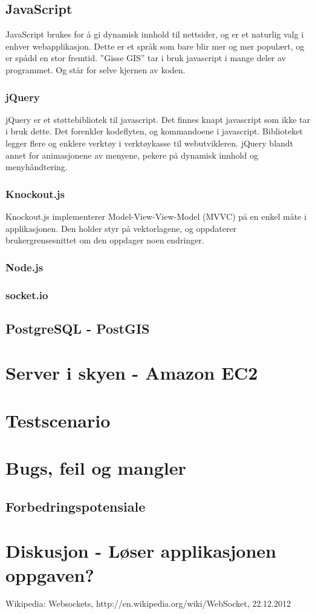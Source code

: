 \documentclass[12pt,twoside,onecolumn]{article}
\begin{document}
	\subsection{JavaScript}
	
		JavaScript brukes for å gi dynamisk innhold til nettsider, og er et naturlig valg i enhver webapplikasjon. Dette er et språk som bare blir mer og mer populært, og er spådd en stor fremtid. ''Gisse GIS'' tar i bruk javascript i mange deler av programmet. Og står for selve kjernen av koden. 
		
		\subsubsection{jQuery}
		
		jQuery er et støttebibliotek til javascript. Det finnes knapt javascript som ikke tar i bruk dette. Det forenkler kodeflyten, og kommandoene i javascript. Biblioteket legger flere og enklere verktøy i verktøykasse til webutvikleren. jQuery blandt annet for animasjonene av menyene, pekere på dynamisk innhold og menyhåndtering.
		
		\subsubsection{Knockout.js}
		
		Knockout.js implementerer Model-View-View-Model (MVVC) på en enkel måte i applikasjonen. Den holder styr på vektorlagene, og oppdaterer brukergrensesnittet om den oppdager noen endringer. 
		
		\subsubsection{Node.js}
		\subsubsection{socket.io}
	\subsection{PostgreSQL - PostGIS}

\section{Server i skyen - Amazon EC2}

\section{Testscenario}
\section{Bugs, feil og mangler}
	\subsection{Forbedringspotensiale}
\section{Diskusjon - Løser applikasjonen oppgaven?}

\newpage
\begin{thebibliography}{9}

	Wikipedia: Websockets, http://en.wikipedia.org/wiki/WebSocket, 22.12.2012

\end{thebibliography}

\listoffigures
\end{document}
